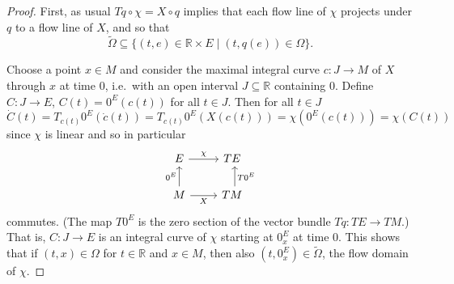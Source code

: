 \documentclass{amsart}
\theoremstyle{plain}
\begin{document}
\begin{proof}
First, as usual $Tq\circ \chi=X\circ q$ implies that each flow line of $\chi$ projects under $q$ to a flow line of $X$, and so that 
\[ \widetilde \Omega\subseteq \{(t, e)\in \mathbb R\times E\mid (t, q(e))\in \Omega\}.
\]

Choose a point $x\in M$ and consider the maximal integral curve $c\colon J\to M$ of $X$ through $x$ at time $0$, i.e.~with an open interval $J\subseteq \mathbb R$ containing $0$. Define $C\colon J\to E$, $C(t)=0^E(c(t))$ for all $t\in J$. Then  for all $t\in J$
\[ \dot C(t)=T_{c(t)}0^E(\dot c(t))=T_{c(t)}0^E(X(c(t)))=\chi(0^E(c(t)))=\chi(C(t))
\]
since $\chi$ is linear and so in particular 
\[\begin{tikzcd}
	E & TE \\
	M & TM
	\arrow["\chi", from=1-1, to=1-2]
	\arrow["{0^E}", from=2-1, to=1-1]
	\arrow["X"', from=2-1, to=2-2]
	\arrow["{T0^E}"', shift right, from=2-2, to=1-2]
\end{tikzcd}\]
commutes. (The map $T0^E$ is the zero section of the vector bundle $Tq\colon TE\to TM$.) That is, $C\colon J\to E$ is an integral curve of $\chi$ starting at $0^E_x$ at time $0$.
This shows that if $(t,x)\in \Omega$ for $t\in\mathbb R$ and $x\in M$, then also $(t,0^E_x)\in\widetilde \Omega$, the flow domain of $\chi$.



\end{proof}
\end{document}
